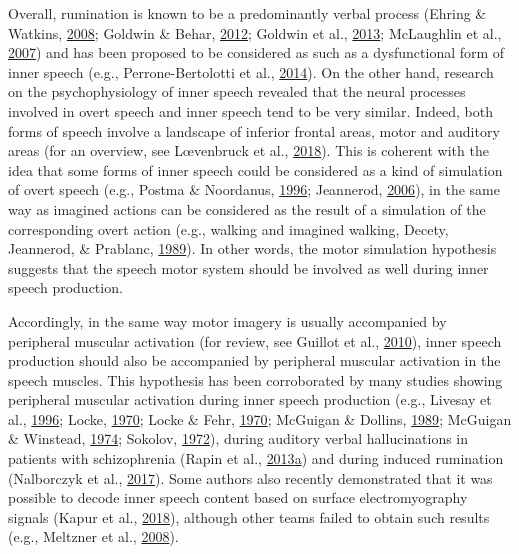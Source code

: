 \documentclass[a4paper,12pt,twoside,openright,oldfontcommands]{memoir}
\begin{document}
Overall, rumination is known to be a predominantly verbal process (Ehring \& Watkins, \protect\hyperlink{ref-ehring_repetitive_2008}{2008}; Goldwin \& Behar, \protect\hyperlink{ref-goldwin_concreteness_2012}{2012}; Goldwin et al., \protect\hyperlink{ref-goldwin_concreteness_2013}{2013}; McLaughlin et al., \protect\hyperlink{ref-mclaughlin_effects_2007}{2007}) and has been proposed to be considered as such as a dysfunctional form of inner speech (e.g., Perrone-Bertolotti et al., \protect\hyperlink{ref-Perrone-Bertolotti2014}{2014}). On the other hand, research on the psychophysiology of inner speech revealed that the neural processes involved in overt speech and inner speech tend to be very similar. Indeed, both forms of speech involve a landscape of inferior frontal areas, motor and auditory areas (for an overview, see Lœvenbruck et al., \protect\hyperlink{ref-loevenbruck_cognitive_2018}{2018}). This is coherent with the idea that some forms of inner speech could be considered as a kind of simulation of overt speech (e.g., Postma \& Noordanus, \protect\hyperlink{ref-postma_production_1996}{1996}; Jeannerod, \protect\hyperlink{ref-jeannerod_motor_2006}{2006}), in the same way as imagined actions can be considered as the result of a simulation of the corresponding overt action (e.g., walking and imagined walking, Decety, Jeannerod, \& Prablanc, \protect\hyperlink{ref-decety_timing_1989}{1989}). In other words, the motor simulation hypothesis suggests that the speech motor system should be involved as well during inner speech production.

Accordingly, in the same way motor imagery is usually accompanied by peripheral muscular activation (for review, see Guillot et al., \protect\hyperlink{ref-guillot_electromyographic_2010}{2010}), inner speech production should also be accompanied by peripheral muscular activation in the speech muscles. This hypothesis has been corroborated by many studies showing peripheral muscular activation during inner speech production (e.g., Livesay et al., \protect\hyperlink{ref-livesay_covert_1996}{1996}; Locke, \protect\hyperlink{ref-locke_subvocal_1970-1}{1970}; Locke \& Fehr, \protect\hyperlink{ref-locke_subvocal_1970}{1970}; McGuigan \& Dollins, \protect\hyperlink{ref-mcguigan_patterns_1989}{1989}; McGuigan \& Winstead, \protect\hyperlink{ref-mcguigan_discriminative_1974}{1974}; Sokolov, \protect\hyperlink{ref-sokolov_inner_1972}{1972}), during auditory verbal hallucinations in patients with schizophrenia (Rapin et al., \protect\hyperlink{ref-rapin_emg_2013}{2013}\protect\hyperlink{ref-rapin_emg_2013}{a}) and during induced rumination (Nalborczyk et al., \protect\hyperlink{ref-nalborczyk_orofacial_2017}{2017}). Some authors also recently demonstrated that it was possible to decode inner speech content based on surface electromyography signals (Kapur et al., \protect\hyperlink{ref-kapur_alterego_2018}{2018}), although other teams failed to obtain such results (e.g., Meltzner et al., \protect\hyperlink{ref-meltzner_speech_2008}{2008}).
\end{document}
